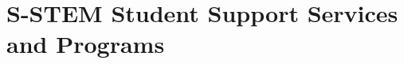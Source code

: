 \documentclass[12pt]{article}
\begin{document}


\section{S-STEM Student Support Services and Programs}


\end{document}
